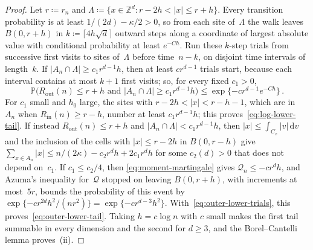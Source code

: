 \documentclass[11pt]{amsart}
\theoremstyle{plain}
\theoremstyle{definition}
\newcommand{\Z}{\mathbb Z}
\renewcommand{\P}{\mathbb P}
\newcommand{\drift}{\kappa}
\newcommand{\dd}{\,\mathrm d}
\newcommand{\Rin}{R_{\mathrm{in}}}
\newcommand{\Rout}{R_{\mathrm{out}}}
\numberwithin{equation}{section}
\begin{document}
\begin{proof}
Let $r\coloneqq r_n$ and $\Lambda\coloneqq\{x\in\Z^d:r-2h<|x|\leq r+h\}$. Every transition probability is at least $1/(2d)-\drift/2>0$, so from each site of~$\Lambda$ the walk leaves $B(0,r+h)$ in $k\coloneqq\lceil4h\sqrt d\rceil$ outward steps along a coordinate of largest absolute value with conditional probability at least $e^{-Ch}$. Run these $k$-step trials from successive first visits to sites of~$\Lambda$ before time~$n-k$, on disjoint time intervals of length~$k$. If $|A_n\cap\Lambda|\geq c_1r^{d-1}h$, then at least $cr^{d-1}$ trials start, because each interval contains at most $k+1$ first visits; so, for every fixed $c_1>0$,
\begin{equation}\label{eq:outer-lower-trials}
\P\bigl(\Rout(n)\leq r+h\text{ and }|A_n\cap\Lambda|\geq c_1r^{d-1}h\bigr)
\leq\exp\{-cr^{d-1}e^{-Ch}\}\, .
\end{equation}
For $c_1$ small and $h_0$ large, the sites with $r-2h<|x|<r-h-1$, which are in~$A_n$ when $\Rin(n)\geq r-h$, number at least $c_1r^{d-1}h$; this proves~\eqref{eq:log-lower-tail}. If instead $\Rout(n)\leq r+h$ and $|A_n\cap\Lambda|<c_1r^{d-1}h$, then $|x|\leq\int_{C_x}|v|\dd v$ and the inclusion of the cells with $|x|\leq r-2h$ in $B(0,r-h)$ give $\sum_{x\in A_n}|x|\leq n/(2\drift)-c_2r^dh+2c_1r^dh$ for some $c_2(d)>0$ that does not depend on~$c_1$. If $c_1\leq c_2/4$, then \eqref{eq:moment-martingale} gives $\mathcal Q_n\leq-cr^dh$, and Azuma's inequality for~$\mathcal Q$ stopped on leaving $B(0,r+h)$, with increments at most~$5r$, bounds the probability of this event by $\exp\{-cr^{2d}h^2/(nr^2)\}=\exp\{-cr^{d-3}h^2\}$. With~\eqref{eq:outer-lower-trials}, this proves~\eqref{eq:outer-lower-tail}. Taking $h=c\log n$ with $c$ small makes the first tail summable in every dimension and the second for $d\geq3$, and the Borel--Cantelli lemma proves~(ii).
\end{proof}



\end{document}
